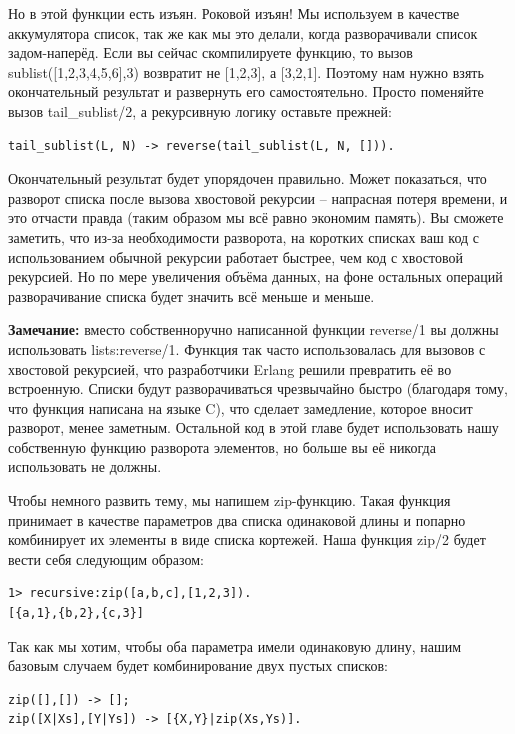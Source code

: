 \documentclass[a4paper,12pt]{report}
\newcommand{\ops}{\colorbox{lgreen}}
\begin{document}
Но в этой функции есть изъян. Роковой изъян! Мы используем в качестве аккумулятора список, так же как мы это делали, когда разворачивали список задом\--наперёд. Если вы сейчас скомпилируете функцию, то вызов \ops{sublist([1,2,3,4,5,6],3)} возвратит не [1,2,3], а [3,2,1]. Поэтому нам нужно взять окончательный результат и развернуть его самостоятельно. Просто поменяйте вызов \ops{tail\_sublist/2}, а рекурсивную логику оставьте прежней:
\begin{lstlisting}[style=erlang]
tail_sublist(L, N) -> reverse(tail_sublist(L, N, [])).
\end{lstlisting}
Окончательный результат будет упорядочен правильно. Может показаться, что разворот списка после вызова хвостовой рекурсии \--- напрасная потеря времени, и это отчасти правда (таким образом мы всё равно экономим память). Вы сможете заметить, что из\--за необходимости разворота, на коротких списках ваш код с использованием обычной рекурсии работает быстрее, чем код с хвостовой рекурсией. Но по мере увеличения объёма данных, на фоне остальных операций разворачивание списка будет значить всё меньше и меньше.\\
\colorbox{lgray}
{
    \begin{minipage}{\linewidth}
\textbf{Замечание:} вместо собственноручно написанной функции \ops{reverse/1} вы должны использовать \ops{lists:reverse/1}. Функция так часто использовалась для вызовов с хвостовой рекурсией, что разработчики Erlang решили превратить её во встроенную. Списки будут разворачиваться чрезвычайно быстро (благодаря тому, что функция написана на языке C), что сделает замедление, которое вносит разворот, менее заметным. Остальной код в этой главе будет использовать нашу собственную функцию разворота элементов, но больше вы её никогда использовать не должны.
    \end{minipage}
}

Чтобы немного развить тему, мы напишем zip\--функцию. Такая функция принимает в качестве параметров два списка одинаковой длины и попарно комбинирует их элементы в виде списка кортежей. Наша функция \ops{zip/2} будет вести себя следующим образом:
\begin{lstlisting}[style=erlang]
1> recursive:zip([a,b,c],[1,2,3]).
[{a,1},{b,2},{c,3}]
\end{lstlisting}

Так как мы хотим, чтобы оба параметра имели одинаковую длину, нашим базовым случаем будет комбинирование двух пустых списков:
\begin{lstlisting}[style=erlang]
zip([],[]) -> [];
zip([X|Xs],[Y|Ys]) -> [{X,Y}|zip(Xs,Ys)].
\end{lstlisting}
\end{document}
